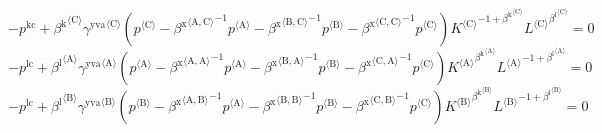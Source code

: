 \begin{equation}
-p^{\mathrm{kc}} + {{\beta^{\mathrm{k}}}^{\langle \mathrm{\mathrm{C}}\rangle}} {{\gamma^{\mathrm{yva}}}^{\langle \mathrm{\mathrm{C}}\rangle}} \left({p}^{\langle \mathrm{C}\rangle} - {{\beta^{\mathrm{x}}}^{\langle \mathrm{\mathrm{A}},\mathrm{\mathrm{C}}\rangle}}^{-1} {{p}^{\langle \mathrm{A}\rangle}} - {{\beta^{\mathrm{x}}}^{\langle \mathrm{\mathrm{B}},\mathrm{\mathrm{C}}\rangle}}^{-1} {{p}^{\langle \mathrm{B}\rangle}} - {{\beta^{\mathrm{x}}}^{\langle \mathrm{\mathrm{C}},\mathrm{\mathrm{C}}\rangle}}^{-1} {{p}^{\langle \mathrm{C}\rangle}}\right) {{{K}^{\langle \mathrm{C}\rangle}}^{-1 + {\beta^{\mathrm{k}}}^{\langle \mathrm{\mathrm{C}}\rangle}}} {{{L}^{\langle \mathrm{C}\rangle}}^{{\beta^{\mathrm{l}}}^{\langle \mathrm{\mathrm{C}}\rangle}}} = 0
\end{equation}
\begin{equation}
-p^{\mathrm{lc}} + {{\beta^{\mathrm{l}}}^{\langle \mathrm{\mathrm{A}}\rangle}} {{\gamma^{\mathrm{yva}}}^{\langle \mathrm{\mathrm{A}}\rangle}} \left({p}^{\langle \mathrm{A}\rangle} - {{\beta^{\mathrm{x}}}^{\langle \mathrm{\mathrm{A}},\mathrm{\mathrm{A}}\rangle}}^{-1} {{p}^{\langle \mathrm{A}\rangle}} - {{\beta^{\mathrm{x}}}^{\langle \mathrm{\mathrm{B}},\mathrm{\mathrm{A}}\rangle}}^{-1} {{p}^{\langle \mathrm{B}\rangle}} - {{\beta^{\mathrm{x}}}^{\langle \mathrm{\mathrm{C}},\mathrm{\mathrm{A}}\rangle}}^{-1} {{p}^{\langle \mathrm{C}\rangle}}\right) {{{K}^{\langle \mathrm{A}\rangle}}^{{\beta^{\mathrm{k}}}^{\langle \mathrm{\mathrm{A}}\rangle}}} {{{L}^{\langle \mathrm{A}\rangle}}^{-1 + {\beta^{\mathrm{l}}}^{\langle \mathrm{\mathrm{A}}\rangle}}} = 0
\end{equation}
\begin{equation}
-p^{\mathrm{lc}} + {{\beta^{\mathrm{l}}}^{\langle \mathrm{\mathrm{B}}\rangle}} {{\gamma^{\mathrm{yva}}}^{\langle \mathrm{\mathrm{B}}\rangle}} \left({p}^{\langle \mathrm{B}\rangle} - {{\beta^{\mathrm{x}}}^{\langle \mathrm{\mathrm{A}},\mathrm{\mathrm{B}}\rangle}}^{-1} {{p}^{\langle \mathrm{A}\rangle}} - {{\beta^{\mathrm{x}}}^{\langle \mathrm{\mathrm{B}},\mathrm{\mathrm{B}}\rangle}}^{-1} {{p}^{\langle \mathrm{B}\rangle}} - {{\beta^{\mathrm{x}}}^{\langle \mathrm{\mathrm{C}},\mathrm{\mathrm{B}}\rangle}}^{-1} {{p}^{\langle \mathrm{C}\rangle}}\right) {{{K}^{\langle \mathrm{B}\rangle}}^{{\beta^{\mathrm{k}}}^{\langle \mathrm{\mathrm{B}}\rangle}}} {{{L}^{\langle \mathrm{B}\rangle}}^{-1 + {\beta^{\mathrm{l}}}^{\langle \mathrm{\mathrm{B}}\rangle}}} = 0
\end{equation}
